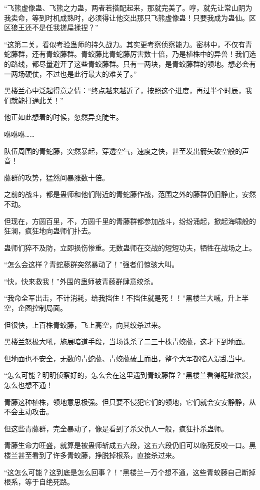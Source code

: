 \begin{this_body}
“飞熊虚像蛊、飞熊之力蛊，两者若搭配起来，那就完美了。哼，就先让常山阴为我卖命，等到时机成熟时，必须得让他交出那只飞熊虚像蛊！只要我成为蛊仙。区区狼王还不是任我搓扁揉捏？”

“这第二关，看似考验蛊师的持久战力。其实更考察侦察能力。密林中，不仅有青蛇藤群，还有青蛟藤群。青蛟藤比青蛇藤厉害数十倍，乃是植株中的异兽！我们选的路线，都尽量避开了这些青蛟藤群。只有一两块，是青蛟藤群的领地。想必会有一两场硬仗，不过也是此行最大的难关了。”

黑楼兰心中泛起得意之情：“终点越来越近了，按照这个进度，再过半个时辰，我们就能打通此关！”

他正如此想着的时候，忽然异变陡生。

咻咻咻……

队伍周围的青蛇藤，突然暴起，穿透空气，速度之快，甚至发出箭矢破空般的声音！

藤群的攻势，猛然间暴涨数十倍。

之前的战斗，都是蛊师和他们附近的青蛇藤作战，范围之外的藤群仍旧静止，安然不动。

但现在，方圆百里，不，方圆千里的青藤群都参加战斗，纷纷涌起，掀起海啸般的狂澜，疯狂地向蛊师们扑去。

蛊师们猝不及防，立即损伤惨重。无数蛊师在交战的短短功夫，牺牲在战场之上。

“怎么会这样？青蛇藤群突然暴动了！”强者们惊骇大叫。

“快，快来救我！”外围的蛊师被青藤群肆意绞杀。

“我命全军出击，不计消耗，给我挡住！不挡住就是死！！”黑楼兰大喊，升上半空，企图控制局面。

但很快，上百株青蛟藤，飞上高空，向其绞杀过来。

黑楼兰怒极大吼，施展暗道手段，当场诛杀了二三十株青蛟藤，这才下到地面。

但地面也不安全，无数的青蛇藤、青蛟藤破土而出，整个大军都陷入混乱当中。

“怎么可能？明明侦察好的，怎么会在这里遇到青蛟藤群？”黑楼兰看得睚眦欲裂，怎么也想不通！

青藤这种植株，领地意思极强。但只要不侵犯它们的领地，它们就会安安静静，从不会主动攻击。

但这些青藤群，完全暴动了，像是看到了杀父仇人一般，疯狂扑杀蛊师。

青藤生命力旺盛，就算是被蛊师斩成五六段，这五六段仍旧可以临死反咬一口。黑楼兰甚至看到了许多青蛟藤，挣脱掉根系，直接杀过来。

“这怎么可能？这到底是怎么回事？！”黑楼兰一万个想不通，这些青蛟藤自己断掉根系，等于自绝死路。


\end{this_body}

